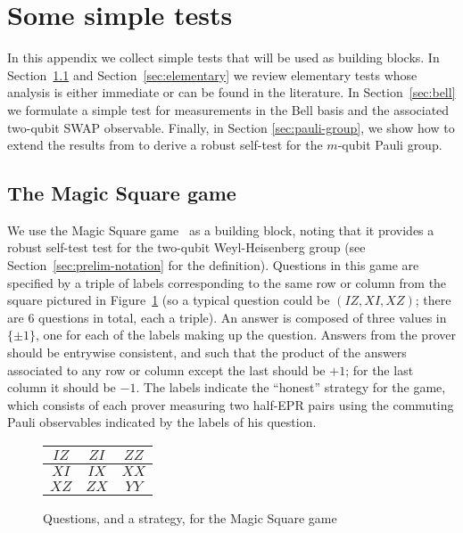 

\section{Some simple tests}
\label{sec:clifford-test}

In this appendix we collect simple tests that will be used as building blocks. In Section~\ref{sec:ms} and Section~\ref{sec:elementary} we review elementary tests whose analysis is either immediate or can be found in the literature. In Section~\ref{sec:bell} we formulate a simple test for measurements in the Bell basis and the associated two-qubit SWAP observable. 
Finally, in Section \ref{sec:pauli-group}, we show how to extend the results from \cite{natarajan2016robust} to derive a robust self-test for the $m$-qubit Pauli group. 


\subsection{The Magic Square game}
\label{sec:ms}

We use the Magic Square game~\cite{Mermin90} as a building block, noting that it  provides a robust self-test test for the two-qubit Weyl-Heisenberg group (see Section~\ref{sec:prelim-notation} for the definition). Questions in this game are specified by a triple of labels corresponding to the same row or column from the square pictured in Figure~\ref{fig:ms} (so a typical question could be $(IZ,XI,XZ)$; there are $6$ questions in total, each a triple). An answer is composed of three values in $\{\pm 1\}$, one for each of the labels making up the question. Answers from the prover should be entrywise consistent, and such that the product of the answers associated to any row or column except the last should be $+1$; for the last column it should be $-1$. The labels indicate the ``honest'' strategy for the game, which consists of each prover measuring two half-EPR pairs using the commuting Pauli observables indicated by the labels of his question. 

\begin{figure}[H]
\begin{center}
\begin{tabular}{|c|c|c|}
\hline
$IZ$ & $ZI$ & $ZZ$ \\
\hline
$XI$ & $IX$ & $XX$ \\
\hline
$XZ$ & $ZX$ & $YY$\\
\hline
\end{tabular}
\end{center}
\caption{Questions, and a strategy, for the Magic Square game}
\label{fig:ms}
\end{figure}

